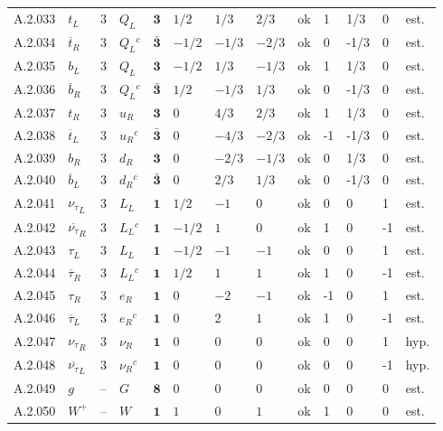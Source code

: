 {\begin{longtable}{@{}lllllllllllll@{}}
A.2.033 & ${t}_L$ & 3 & $Q_L$ & $\mathbf{3}$ & $1/2$ & $1/3$ & $2/3$ & ok & 1 & 1/3 & 0 & est. \\
A.2.034 & $\overline{t}_{R}$ & 3 & $Q_L$$^{c}$ & $\bar{\mathbf{3}}$ & $-1/2$ & $-1/3$ & $-2/3$ & ok & 0 & -1/3 & 0 & est. \\
A.2.035 & ${b}_L$ & 3 & $Q_L$ & $\mathbf{3}$ & $-1/2$ & $1/3$ & $-1/3$ & ok & 1 & 1/3 & 0 & est. \\
A.2.036 & $\overline{b}_{R}$ & 3 & $Q_L$$^{c}$ & $\bar{\mathbf{3}}$ & $1/2$ & $-1/3$ & $1/3$ & ok & 0 & -1/3 & 0 & est. \\
A.2.037 & ${t}_R$ & 3 & $u_R$ & $\mathbf{3}$ & $0$ & $4/3$ & $2/3$ & ok & 1 & 1/3 & 0 & est. \\
A.2.038 & $\overline{t}_{L}$ & 3 & $u_R$$^{c}$ & $\bar{\mathbf{3}}$ & $0$ & $-4/3$ & $-2/3$ & ok & -1 & -1/3 & 0 & est. \\
A.2.039 & ${b}_R$ & 3 & $d_R$ & $\mathbf{3}$ & $0$ & $-2/3$ & $-1/3$ & ok & 0 & 1/3 & 0 & est. \\
A.2.040 & $\overline{b}_{L}$ & 3 & $d_R$$^{c}$ & $\bar{\mathbf{3}}$ & $0$ & $2/3$ & $1/3$ & ok & 0 & -1/3 & 0 & est. \\
A.2.041 & ${\nu_\tau}_L$ & 3 & $L_L$ & $\mathbf{1}$ & $1/2$ & $-1$ & $0$ & ok & 0 & 0 & 1 & est. \\
A.2.042 & $\overline{\nu_\tau}_{R}$ & 3 & $L_L$$^{c}$ & $\mathbf{1}$ & $-1/2$ & $1$ & $0$ & ok & 1 & 0 & -1 & est. \\
A.2.043 & ${\tau}_L$ & 3 & $L_L$ & $\mathbf{1}$ & $-1/2$ & $-1$ & $-1$ & ok & 0 & 0 & 1 & est. \\
A.2.044 & $\overline{\tau}_{R}$ & 3 & $L_L$$^{c}$ & $\mathbf{1}$ & $1/2$ & $1$ & $1$ & ok & 1 & 0 & -1 & est. \\
A.2.045 & ${\tau}_R$ & 3 & $e_R$ & $\mathbf{1}$ & $0$ & $-2$ & $-1$ & ok & -1 & 0 & 1 & est. \\
A.2.046 & $\overline{\tau}_{L}$ & 3 & $e_R$$^{c}$ & $\mathbf{1}$ & $0$ & $2$ & $1$ & ok & 1 & 0 & -1 & est. \\
A.2.047 & ${\nu_\tau}_R$ & 3 & $\nu_R$ & $\mathbf{1}$ & $0$ & $0$ & $0$ & ok & 0 & 0 & 1 & hyp. \\
A.2.048 & $\overline{\nu_\tau}_{L}$ & 3 & $\nu_R$$^{c}$ & $\mathbf{1}$ & $0$ & $0$ & $0$ & ok & 0 & 0 & -1 & hyp. \\
A.2.049 & $g$ & -- & $G$ & $\mathbf{8}$ & $0$ & $0$ & $0$ & ok & 0 & 0 & 0 & est. \\
A.2.050 & $W^+$ & -- & $W$ & $\mathbf{1}$ & $1$ & $0$ & $1$ & ok & 1 & 0 & 0 & est. \\

\end{longtable}}
